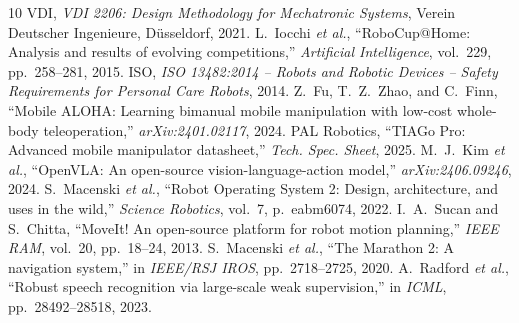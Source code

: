 \documentclass[10pt,a4paper]{article}
\begin{document}
\vspace{-0.4em}
\begin{thebibliography}{10}
\scriptsize
{} VDI, \emph{VDI 2206: Design Methodology for Mechatronic Systems}, Verein Deutscher Ingenieure, D{\"u}sseldorf, 2021.
 L.~Iocchi \emph{et al.}, ``RoboCup@Home: Analysis and results of evolving competitions,'' \emph{Artificial Intelligence}, vol.~229, pp.~258--281, 2015.
 ISO, \emph{ISO 13482:2014 -- Robots and Robotic Devices -- Safety Requirements for Personal Care Robots}, 2014.
 Z.~Fu, T.~Z.~Zhao, and C.~Finn, ``Mobile ALOHA: Learning bimanual mobile manipulation with low-cost whole-body teleoperation,'' \emph{arXiv:2401.02117}, 2024.
 PAL Robotics, ``TIAGo Pro: Advanced mobile manipulator datasheet,'' \emph{Tech. Spec. Sheet}, 2025.
 M.~J.~Kim \emph{et al.}, ``OpenVLA: An open-source vision-language-action model,'' \emph{arXiv:2406.09246}, 2024.
 S.~Macenski \emph{et al.}, ``Robot Operating System 2: Design, architecture, and uses in the wild,'' \emph{Science Robotics}, vol.~7, p.~eabm6074, 2022.
 I.~A.~Sucan and S.~Chitta, ``MoveIt! An open-source platform for robot motion planning,'' \emph{IEEE RAM}, vol.~20, pp.~18--24, 2013.
 S.~Macenski \emph{et al.}, ``The Marathon 2: A navigation system,'' in \emph{IEEE/RSJ IROS}, pp.~2718--2725, 2020.
 A.~Radford \emph{et al.}, ``Robust speech recognition via large-scale weak supervision,'' in \emph{ICML}, pp.~28492--28518, 2023.
\end{thebibliography}
\end{document}
